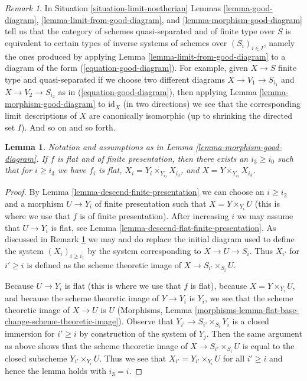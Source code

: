 \documentclass{stacks-project}
\theoremstyle{plain}
\newtheorem{lemma}[subsection]{Lemma}
\theoremstyle{definition}
\theoremstyle{remark}
\newtheorem{remark}[subsection]{Remark}
\numberwithin{equation}{subsection}
\begin{document}
\begin{remark}
\label{remark-finite-type-gives-well-defined-system}
In Situation \ref{situation-limit-noetherian}
Lemmas \ref{lemma-good-diagram}, \ref{lemma-limit-from-good-diagram}, and
\ref{lemma-morphism-good-diagram}
tell us that the category of schemes quasi-separated and
of finite type over $S$ is equivalent to certain types of
inverse systems of schemes over $(S_i)_{i \in I}$, namely
the ones produced by applying Lemma \ref{lemma-limit-from-good-diagram}
to a diagram of the form (\ref{equation-good-diagram}).
For example, given $X \to S$ finite type and quasi-separated
if we choose two different diagrams $X \to V_1 \to S_{i_1}$
and $X \to V_2 \to S_{i_2}$ as in (\ref{equation-good-diagram}), then
applying Lemma \ref{lemma-morphism-good-diagram} to $\text{id}_X$
(in two directions)
we see that the corresponding limit descriptions of
$X$ are canonically isomorphic (up to shrinking the
directed set $I$). And so on and so forth.
\end{remark}

\begin{lemma}
\label{lemma-morphism-good-diagram-flat}
Notation and assumptions as in Lemma \ref{lemma-morphism-good-diagram}.
If $f$ is flat and of finite presentation, then
there exists an $i_3 \geq i_0$ such that for $i \geq i_3$ we have
$f_i$ is flat, $X_i = Y_i \times_{Y_{i_3}} X_{i_3}$, and
$X = Y \times_{Y_{i_3}} X_{i_3}$.
\end{lemma}

\begin{proof}
By Lemma \ref{lemma-descend-finite-presentation}
we can choose an $i \geq i_2$ and a morphism
$U \to Y_i$ of finite presentation such that $X = Y \times_{Y_i} U$
(this is where we use that $f$ is of finite presentation).
After increasing $i$ we may assume that $U \to Y_i$ is flat, see
Lemma \ref{lemma-descend-flat-finite-presentation}.
As discussed in Remark \ref{remark-finite-type-gives-well-defined-system}
we may and do replace the initial diagram used to define the system
$(X_i)_{i \geq i_1}$ by the system corresponding to
$X \to U \to S_i$. Thus $X_{i'}$ for $i' \geq i$ is defined as
the scheme theoretic image of $X \to S_{i'} \times_{S_i} U$.

\medskip\noindent
Because $U \to Y_i$ is flat (this is where we use that $f$ is flat),
because $X = Y \times_{Y_i} U$, and
because the scheme theoretic image of $Y \to Y_i$ is $Y_i$,
we see that the scheme theoretic image of $X \to U$ is $U$
(Morphisms, Lemma
\ref{morphisms-lemma-flat-base-change-scheme-theoretic-image}).
Observe that $Y_{i'} \to S_{i'} \times_{S_i} Y_i$ is a closed
immersion for $i' \geq i$ by construction of the system of $Y_j$.
Then the same argument as above shows that the scheme theoretic image
of $X \to S_{i'} \times_{S_i} U$
is equal to the closed subscheme $Y_{i'} \times_{Y_i} U$.
Thus we see that $X_{i'} = Y_{i'} \times_{Y_i} U$ for all $i' \geq i$
and hence the lemma holds with $i_3 = i$.
\end{proof}
\end{document}
